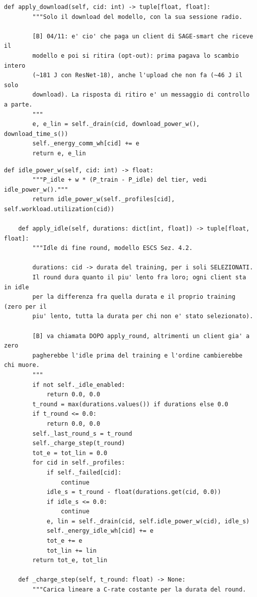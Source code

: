 \documentclass[11pt,a4paper]{article}
\begin{document}
\begin{lstlisting}[style=py,firstnumber=362,caption={\texttt{tesifl/device/world\_state.py}, lines 362--423}]
    def apply_download(self, cid: int) -> tuple[float, float]:
        """Solo il download del modello, con la sua sessione radio.

        [B] 04/11: e' cio' che paga un client di SAGE-smart che riceve il
        modello e poi si ritira (opt-out): prima pagava lo scambio intero
        (~181 J con ResNet-18), anche l'upload che non fa (~46 J il solo
        download). La risposta di ritiro e' un messaggio di controllo a parte.
        """
        e, e_lin = self._drain(cid, download_power_w(), download_time_s())
        self._energy_comm_wh[cid] += e
        return e, e_lin
\end{lstlisting}

\begin{lstlisting}[style=py,firstnumber=425,caption={\texttt{tesifl/device/world\_state.py}, lines 425--475}]
    def idle_power_w(self, cid: int) -> float:
        """P_idle + w * (P_train - P_idle) del tier, vedi idle_power_w()."""
        return idle_power_w(self._profiles[cid], self.workload.utilization(cid))

    def apply_idle(self, durations: dict[int, float]) -> tuple[float, float]:
        """Idle di fine round, modello ESCS Sez. 4.2.

        durations: cid -> durata del training, per i soli SELEZIONATI.
        Il round dura quanto il piu' lento fra loro; ogni client sta in idle
        per la differenza fra quella durata e il proprio training (zero per il
        piu' lento, tutta la durata per chi non e' stato selezionato).

        [B] va chiamata DOPO apply_round, altrimenti un client gia' a zero
        pagherebbe l'idle prima del training e l'ordine cambierebbe chi muore.
        """
        if not self._idle_enabled:
            return 0.0, 0.0
        t_round = max(durations.values()) if durations else 0.0
        if t_round <= 0.0:
            return 0.0, 0.0
        self._last_round_s = t_round
        self._charge_step(t_round)
        tot_e = tot_lin = 0.0
        for cid in self._profiles:
            if self._failed[cid]:
                continue
            idle_s = t_round - float(durations.get(cid, 0.0))
            if idle_s <= 0.0:
                continue
            e, lin = self._drain(cid, self.idle_power_w(cid), idle_s)
            self._energy_idle_wh[cid] += e
            tot_e += e
            tot_lin += lin
        return tot_e, tot_lin

    def _charge_step(self, t_round: float) -> None:
        """Carica lineare a C-rate costante per la durata del round.


\end{lstlisting}
\end{document}
